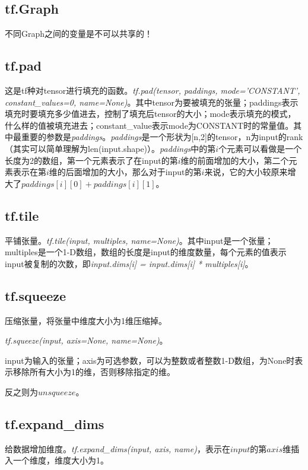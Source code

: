 \subsection{tf.Graph}
不同Graph之间的变量是不可以共享的！


\subsection{tf.pad}
这是tf种对tensor进行填充的函数。\textit{tf.pad(tensor, paddings, mode='CONSTANT', constant\_values=0, name=None)}。其中tensor为要被填充的张量；paddings表示填充时要填充多少值进去，控制了填充后tensor的大小；mode表示填充的模式，什么样的值被填充进去；constant\_value表示mode为CONSTANT时的常量值。其中最重要的参数是\textit{paddings}。\textit{paddings}是一个形状为[n,2]的tensor，n为input的rank（其实可以简单理解为len(input.shape)）。\textit{paddings}中的第$i$个元素可以看做是一个长度为2的数组，第一个元素表示了在input的第$i$维的前面增加的大小，第二个元素表示在第$i$维的后面增加的大小，那么对于input的第$i$来说，它的大小较原来增大了$paddings[i][0]+paddings[i][1]$。

\subsection{tf.tile}平铺张量。\textit{tf.tile(input, multiples, name=None)}。其中input是一个张量；multiples是一个1-D数组，数组的长度是input的维度数量，每个元素的值表示input被复制的次数，即\textit{input.dims[i] = input.dims[i] * multiples[i]}。

\subsection{tf.squeeze}压缩张量，将张量中维度大小为1维压缩掉。

\textit{tf.squeeze(input, axis=None, name=None)}。

input为输入的张量；axis为可选参数，可以为整数或者整数1-D数组，为None时表示移除所有大小为1的维，否则移除指定的维。

反之则为$unsqueeze$。

\subsection{tf.expand\_dims}给数据增加维度。\textit{tf.expand\_dims(input, axis, name)}，表示在$input$的第$axis$维插入一个维度，维度大小为1。


